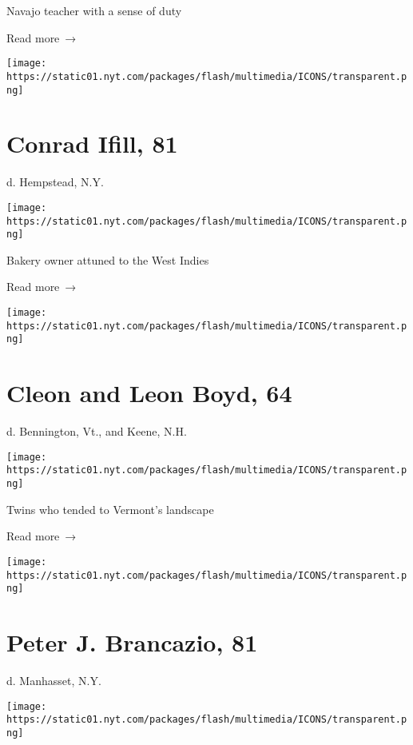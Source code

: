 Navajo teacher with a sense of duty

 Read more~→

\href{https://www.nytimes.com/2020/05/18/obituaries/conrad-ifill-dead-coronavirus.html}{}

\texttt{[image: https://static01.nyt.com/packages/flash/multimedia/ICONS/transparent.png]}

\hypertarget{conrad-ifill-81}{%
\section{Conrad Ifill, 81}\label{conrad-ifill-81}}

d. Hempstead, N.Y.

\texttt{[image: https://static01.nyt.com/packages/flash/multimedia/ICONS/transparent.png]}

Bakery owner attuned to the West Indies

 Read more~→

\href{https://www.nytimes.com/2020/05/18/obituaries/cleon-and-leon-boyd-dead-coronavirus.html}{}

\texttt{[image: https://static01.nyt.com/packages/flash/multimedia/ICONS/transparent.png]}

\hypertarget{cleon-and-leon-boyd-64}{%
\section{Cleon and Leon Boyd, 64}\label{cleon-and-leon-boyd-64}}

d. Bennington, Vt., and Keene, N.H.

\texttt{[image: https://static01.nyt.com/packages/flash/multimedia/ICONS/transparent.png]}

Twins who tended to Vermont's landscape

 Read more~→

\href{https://www.nytimes.com/2020/05/16/obituaries/peter-brancazio-dead-coronavirus.html}{}

\texttt{[image: https://static01.nyt.com/packages/flash/multimedia/ICONS/transparent.png]}

\hypertarget{peter-j-brancazio-81}{%
\section{Peter J. Brancazio, 81}\label{peter-j-brancazio-81}}

d. Manhasset, N.Y.

\texttt{[image: https://static01.nyt.com/packages/flash/multimedia/ICONS/transparent.png]}

